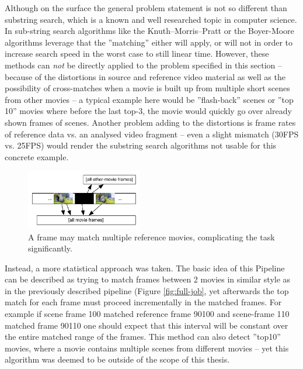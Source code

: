 Although on the surface the general problem statement is not so different than substring search, which is a known and well researched topic in computer science. In sub-string search algorithms like the Knuth–Morris–Pratt \cite{kmp-string-search} or the Boyer-Moore \cite{boyer-string-search} algorithms leverage that the ''matching'' either will apply, or will not in order to increase search speed in the worst case to still linear time. However, these methods can \textit{not} be directly applied to the problem specified in this section -- because of the distortions in source and reference video material as well as the possibility of cross-matches when a movie is built up from multiple short scenes from other movies -- a typical example here would be ''flash-back'' scenes or ''top 10'' movies where before the last top-3, the movie would quickly go over already shown frames of scenes. Another problem adding to the distortions is frame rates of reference data vs. an analysed video fragment -- even a slight mismatch (30FPS vs. 25FPS) would render the substring search algorithms not usable for this concrete example.

\begin{figure}[ch!]
  \centering
  \includegraphics[width=0.45\textwidth]{img/frames-timeline-matching-missmatch}
  \caption{A frame may match multiple reference movies, complicating the task significantly.}
\end{figure}



Instead, a more statistical approach was taken. The basic idea of this Pipeline can be described as trying to match frames between 2 movies in similar style as in the previously described pipeline (Figure \ref{fig:full-job}, yet afterwards the top match for each frame must proceed incrementally in the matched frames. For example if scene frame 100 matched reference frame 90100 and scene-frame 110 matched frame 90110 one should expect that this interval will be constant over the entire matched range of the frames. This method can also detect ''top10'' movies, where a movie contains multiple scenes from different movies -- yet this algorithm was deemed to be outside of the scope of this thesis.

